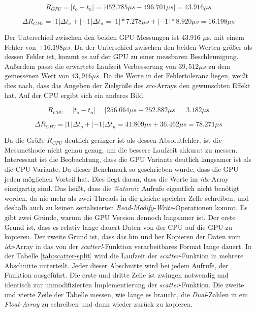 $$
 R_{GPU} = | t_o - t_n | = | 452.785 \mu s - 496.701 \mu s | = 43.916 \mu s
$$

$$
 \Delta R_{GPU} = | 1 | \Delta t_o + |-1| \Delta t_n = | 1| * 7.278 \mu s +  |-1| * 8.920 \mu s = 16.198 \mu s
$$

Der Unterschied zwischen den beiden GPU Messungen ist 43.916 $\mu$s, mit einem Fehler von $\pm 16.198 \mu s$.
Da der Unterschied zwischen den beiden Werten größer als dessen Fehler ist, kommt es auf der GPU zu einer messbaren Beschleunigung.
Außerdem passt die erwartete Laufzeit Verbesserung von $39,512 \mu s$ zu dem gemessenen Wert von $43,916 \mu s$.
Da die Werte in der Fehlertoleranz liegen, weißt dies nach, dass das Angeben der Zielgröße des \textit{src}-Arrays den gewünschten Effekt hat.
Auf der CPU ergibt sich ein anderes Bild.

$$
R_{CPU} = |t_o - t_n| = | 256.064 \mu s - 252.882 \mu s | =  3.182 \mu s
$$

$$
\Delta R_{CPU} = | 1 | \Delta t_o + |-1| \Delta t_n  = 41.809 \mu s + 36.462 \mu s = 78.271 \mu s
$$


Da die Größe $R_{CPU}$ deutlich geringer ist als dessen Absolutfehler, ist die Messmethode nicht genau genug, um die bessere Laufzeit akkurat zu messen.
Interessant ist die Beobachtung, dass die GPU Variante deutlich langsamer ist als die CPU Variante.
Da dieser Benchmark so geschrieben wurde, dass die GPU jeden möglichen Vorteil hat.
Dies liegt daran, dass die Werte im \textit{idx}-Array einzigartig sind.
Das heißt, dass die \textit{@atomic} Aufrufe eigentlich nicht benötigt werden, da nie mehr als zwei Threads in die gleiche speicher Zelle schreiben,
und deshalb auch zu keinen serialisierten \textit{Read-Modify-Write}-Operationen kommt.
Es gibt zwei Gründe, warum die GPU Version dennoch langsamer ist.
Der erste Grund ist, dass es relativ lange dauert Daten von der CPU auf die GPU zu kopieren.
Der zweite Grund ist, dass das hin und her Kopieren der Daten vom \textit{idx}-Array in das von der \textit{scatter!}-Funktion verarbeitbares Format
lange dauert. 
In der Tabelle \ref{tab:scatter-split} wird die Laufzeit der \textit{scatter}-Funktion in mehrere Abschnitte unterteilt. 
Jeder dieser Abschnitte wird bei jedem Aufrufe,
der Funktion ausgeführt.
Die erste und dritte Zeile ist zwingen notwendig und identisch zur unmodifizierten Implementierung der \textit{scatter}-Funktion.
Die zweite und vierte Zeile der Tabelle messen, wie lange es braucht, die \textit{Dual}-Zahlen in ein \textit{Float-Array} zu schreiben 
und dann wieder zurück zu kopieren.

